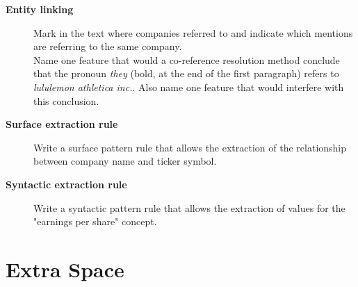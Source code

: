\documentclass[12pt]{article}
\begin{document}
\begin{description}
\item[\bf Entity linking] Mark in the text where companies referred to and indicate which mentions are referring to the same company.\\[3mm]
Name one feature that would a co-reference resolution method conclude that the pronoun {\em they} (bold, at the end of the first paragraph) refers to {\em  lululemon athletica inc.}. Also name one feature that would interfere with this conclusion.\vspace{2cm}

\item[\bf Surface extraction rule] Write a surface pattern rule that allows the extraction of the relationship between company name and ticker symbol.
\vspace{1.5cm}
\item[\bf Syntactic extraction rule] Write a syntactic pattern rule that allows the extraction of values for the "earnings per share" concept.
\end{description}

\newpage
\section*{Extra Space}
\newpage
\end{document}

